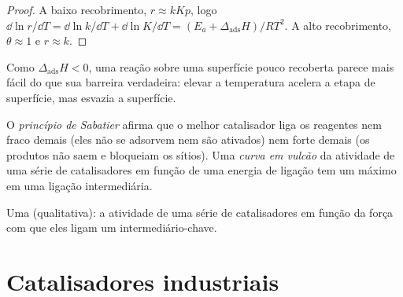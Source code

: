 \begin{proof}
A baixo recobrimento, $r \approx kKp$, logo $\dd\ln r/\dd T = \dd\ln k/\dd T + \dd\ln K/\dd T = (E_a + \Delta_{\mathrm{ads}}H)/RT^2$.
A alto recobrimento, $\theta \approx 1$ e $r \approx k$.
\end{proof}

Como $\Delta_{\mathrm{ads}}H < 0$, uma reação sobre uma superfície pouco recoberta parece mais fácil
do que sua barreira verdadeira: elevar a temperatura acelera a etapa de superfície,
mas esvazia a superfície.

\begin{definition}\label{def:b3:surfaces-catalysis:sabatier}
O \emph{princípio de Sabatier} afirma que o melhor
catalisador liga os reagentes nem fraco demais (eles não se adsorvem nem são
ativados) nem forte demais (os produtos não saem e bloqueiam os sítios). Uma
\emph{curva em vulcão} da atividade de uma série de
catalisadores em função de uma energia de ligação tem um máximo em uma ligação intermediária.
\end{definition}

\begin{omfigure}

{\small Uma  (qualitativa): a atividade de uma série de catalisadores
em função da força com que eles ligam um intermediário-chave.}
\end{omfigure}

\section{Catalisadores industriais}

